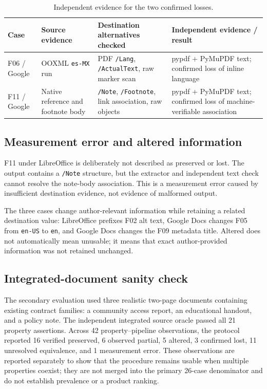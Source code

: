 \begin{table}[t]
\centering\scriptsize
\caption{Independent evidence for the two confirmed losses.}
\label{tab:losses}
\begin{tabular}{p{}p{}p{}p{}}
\hline
Case & Source evidence & Destination alternatives checked & Independent evidence / result \\
\hline
F06 / Google & OOXML \texttt{es-MX} run & PDF \texttt{/Lang}, \texttt{/ActualText}, raw marker scan & pypdf + PyMuPDF text; confirmed loss of inline language \\
F11 / Google & Native reference and footnote body & \texttt{/Note}, \texttt{/Footnote}, link association, raw objects & pypdf + PyMuPDF text; confirmed loss of machine-verifiable association \\
\hline
\end{tabular}
\end{table}

\subsection{Measurement error and altered information}

F11 under LibreOffice is deliberately not described as preserved or lost. The output contains a \texttt{/Note} structure, but the extractor and independent text check cannot resolve the note-body association. This is a measurement error caused by insufficient destination evidence, not evidence of malformed output.

The three \altered{} cases change author-relevant information while retaining a related destination value: LibreOffice prefixes F02 alt text, Google Docs changes F05 from \texttt{en-US} to \texttt{en}, and Google Docs changes the F09 metadata title. Altered does not automatically mean unusable; it means that exact author-provided information was not retained unchanged.

\subsection{Integrated-document sanity check}

The secondary evaluation used three realistic two-page documents containing existing contract families: a community access report, an educational handout, and a policy note. The independent integrated source oracle passed all 21 property assertions. Across 42 property--pipeline observations, the protocol reported 16 verified preserved, 6 observed partial, 5 altered, 3 confirmed lost, 11 unresolved equivalence, and 1 measurement error. These observations are reported separately to show that the procedure remains usable when multiple properties coexist; they are not merged into the primary 26-case denominator and do not establish prevalence or a product ranking.


